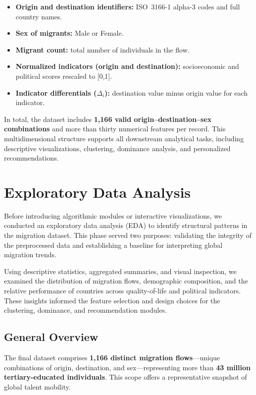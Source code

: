 \documentclass[11pt]{article}
\begin{document}
\begin{itemize}
    \item \textbf{Origin and destination identifiers:} ISO~3166-1 alpha-3 codes and full country names.
    \item \textbf{Sex of migrants:} Male or Female.
    \item \textbf{Migrant count:} total number of individuals in the flow.
    \item \textbf{Normalized indicators (origin and destination):} socioeconomic and political scores rescaled to [0,1].
    \item \textbf{Indicator differentials ($\Delta_i$):} destination value minus origin value for each indicator.
\end{itemize}

\noindent
In total, the dataset includes \textbf{1,166 valid origin--destination--sex combinations} and more than thirty numerical features per record. This multidimensional structure supports all downstream analytical tasks, including descriptive visualizations, clustering, dominance analysis, and personalized recommendations.


\newpage

\section{Exploratory Data Analysis} 

\noindent
Before introducing algorithmic modules or interactive visualizations, we conducted an exploratory data analysis (EDA) to identify structural patterns in the migration dataset. This phase served two purposes: validating the integrity of the preprocessed data and establishing a baseline for interpreting global migration trends.

\medskip
\noindent
Using descriptive statistics, aggregated summaries, and visual inspection, we examined the distribution of migration flows, demographic composition, and the relative performance of countries across quality-of-life and political indicators. These insights informed the feature selection and design choices for the clustering, dominance, and recommendation modules.

\subsection{General Overview}

\noindent
The final dataset comprises \textbf{1,166 distinct migration flows}—unique combinations of origin, destination, and sex—representing more than \textbf{43 million tertiary-educated individuals}. This scope offers a representative snapshot of global talent mobility.
\end{document}
